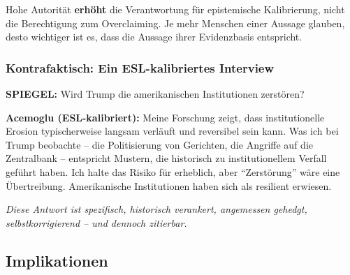 \begin{principlebox}
Hohe Autorit\"at \textbf{erh\"oht} die Verantwortung f\"ur epistemische Kalibrierung, nicht die Berechtigung zum Overclaiming. Je mehr Menschen einer Aussage glauben, desto wichtiger ist es, dass die Aussage ihrer Evidenzbasis entspricht.
\end{principlebox}


\subsubsection{Kontrafaktisch: Ein ESL-kalibriertes Interview}

\begin{tcolorbox}[colback=blue!5!white,colframe=blue!50!black]
\textbf{SPIEGEL:} Wird Trump die amerikanischen Institutionen zerst\"oren?

\textbf{Acemoglu (ESL-kalibriert):} Meine Forschung zeigt, dass institutionelle Erosion typischerweise langsam verl\"auft und reversibel sein kann. Was ich bei Trump beobachte -- die Politisierung von Gerichten, die Angriffe auf die Zentralbank -- entspricht Mustern, die historisch zu institutionellem Verfall gef\"uhrt haben. Ich halte das Risiko f\"ur erheblich, aber ``Zerst\"orung'' w\"are eine \"Ubertreibung. Amerikanische Institutionen haben sich als resilient erwiesen.

\emph{Diese Antwort ist spezifisch, historisch verankert, angemessen gehedgt, selbstkorrigierend -- und dennoch zitierbar.}
\end{tcolorbox}


\subsection{Implikationen}

